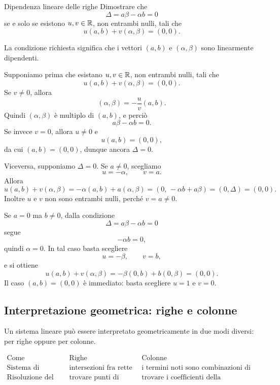 \documentclass[a4paper]{article}
\begin{document}
\begin{snippetexercise}{Dipendenza lineare delle righe}
    Dimostrare che
    \[
        \Delta=a\beta-\alpha b=0
    \]
    se e solo se esistono \(u,v\in\mathbb{R}\), non entrambi nulli, tali che
    \[
        u(a,b)+v(\alpha,\beta)=(0,0).
    \]
\end{snippetexercise}

\begin{snippetsolution}{}
    La condizione richiesta significa che i vettori \((a,b)\) e \((\alpha,\beta)\) sono linearmente dipendenti.

    Supponiamo prima che esistano \(u,v\in\mathbb{R}\), non entrambi nulli, tali che
    \[
        u(a,b)+v(\alpha,\beta)=(0,0).
    \]
    Se \(v\neq 0\), allora
    \[
        (\alpha,\beta)=-\frac{u}{v}(a,b).
    \]
    Quindi \((\alpha,\beta)\) è multiplo di \((a,b)\), e perciò
    \[
        a\beta-\alpha b=0.
    \]
    Se invece \(v=0\), allora \(u\neq 0\) e
    \[
        u(a,b)=(0,0),
    \]
    da cui \((a,b)=(0,0)\), dunque ancora \(\Delta=0\).

    Viceversa, supponiamo \(\Delta=0\). Se \(a\neq 0\), scegliamo
    \[
        u=-\alpha,
        \qquad
        v=a.
    \]
    Allora
    \[
        u(a,b)+v(\alpha,\beta)
        =
        -\alpha(a,b)+a(\alpha,\beta)
        =
        (0,\,-\alpha b+a\beta)
        =
        (0,\Delta)
        =
        (0,0).
    \]
    Inoltre \(u\) e \(v\) non sono entrambi nulli, perché \(v=a\neq 0\).

    Se \(a=0\) ma \(b\neq 0\), dalla condizione
    \[
        \Delta=a\beta-\alpha b=0
    \]
    segue
    \[
        -\alpha b=0,
    \]
    quindi \(\alpha=0\). In tal caso basta scegliere
    \[
        u=-\beta,
        \qquad
        v=b,
    \]
    e si ottiene
    \[
        u(a,b)+v(\alpha,\beta)
        =
        -\beta(0,b)+b(0,\beta)
        =
        (0,0).
    \]
    Il caso \((a,b)=(0,0)\) è immediato: basta scegliere \(u=1\) e \(v=0\).
\end{snippetsolution}

\subsection{Interpretazione geometrica: righe e colonne}

Un sistema lineare può essere interpretato geometricamente in due modi diversi: per righe oppure per colonne.

\[
    \begin{array}{c|c|c}
        \text{Come} & \text{Righe} & \text{Colonne}\\
        \hline
        \text{Sistema di equazioni}
        &
        \text{intersezioni fra rette}
        &
        \text{i termini noti sono combinazioni di vettori coefficienti}\\
        \hline
        \text{Risoluzione del sistema}
        &
        \text{trovare punti di intersezione}
        &
        \text{trovare i coefficienti della combinazione}
    \end{array}
\]
\end{document}
